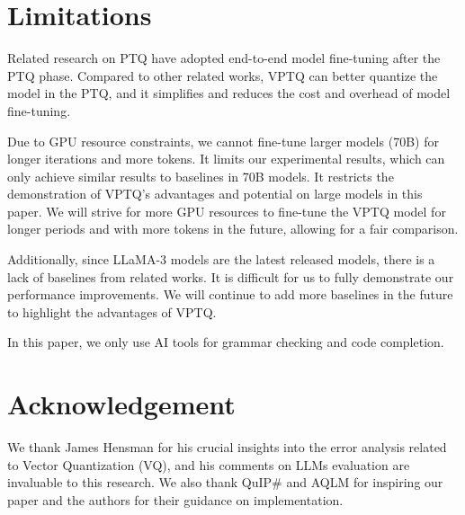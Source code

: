 \section{Limitations}
Related research on PTQ \citep{AQLM, QuIPsharp, GPTVQ} have adopted end-to-end model fine-tuning after the PTQ phase. Compared to other related works, VPTQ can better quantize the model in the PTQ, and it simplifies and reduces the cost and overhead of model fine-tuning.

Due to GPU resource constraints, we cannot fine-tune larger models (70B) for longer iterations and more tokens. 
It limits our experimental results, which can only achieve similar results to baselines in 70B models. It restricts the demonstration of VPTQ's advantages and potential on large models in this paper. 
We will strive for more GPU resources to fine-tune the VPTQ model for longer periods and with more tokens in the future, allowing for a fair comparison.

Additionally, since LLaMA-3 models are the latest released models, there is a lack of baselines from related works. 
It is difficult for us to fully demonstrate our performance improvements. 
We will continue to add more baselines in the future to highlight the advantages of VPTQ.

In this paper, we only use AI tools for grammar checking and code completion.

\vspace{-0.1in}
\section*{Acknowledgement}
\vspace{-0.1in}
We thank James Hensman for his crucial insights into the error analysis related to Vector Quantization (VQ), and his comments on LLMs evaluation are invaluable to this research. We also thank QuIP\# and AQLM for inspiring our paper and the authors for their guidance on implementation.



